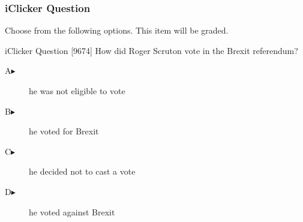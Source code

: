 \begin{frame}
  \frametitle{iClicker Question}
Choose from the following options. This item will be graded.
\begin{block}{iClicker Question}
[9674]   How did Roger Scruton vote in the Brexit referendum?
\end{block}
\begin{description}
\item[A\hspace{.2in}$\blacktriangleright$] he was not eligible to vote
\item[B\hspace{.2in}$\blacktriangleright$] he voted for Brexit
\item[C\hspace{.2in}$\blacktriangleright$] he decided not to cast a vote
\item[D\hspace{.2in}$\blacktriangleright$] he voted against Brexit
\end{description}
\end{frame}
